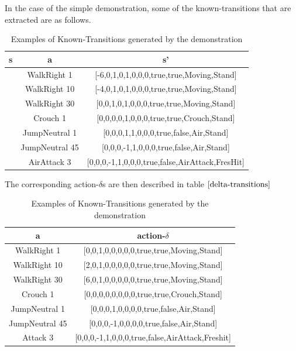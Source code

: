 In the case of the simple demonstration, some of the known-transitions that are extracted are as follows.

\begin{table}[h]
	\centering
	\small
	\caption{Examples of Known-Transitions generated by the demonstration}
	\begin{tabular}{| c | c | c |}
		\hline
		s & a & s' \\
		\hline
		[-6,0,0,0,1,0,0,0,true,true,Stand,Stand] & WalkRight 1 & [-6,0,1,0,1,0,0,0,true,true,Moving,Stand]\\
		\hline
		[-6,0,0,0,1,0,0,0,true,true,Stand,Stand] & WalkRight 10 & [-4,0,1,0,1,0,0,0,true,true,Moving,Stand]\\
		\hline
		[-6,0,0,0,1,0,0,0,true,true,Stand,Stand] & WalkRight 30 & [0,0,1,0,1,0,0,0,true,true,Moving,Stand]\\
		\hline
		[0,0,1,0,1,0,0,0,true,true,Moving,Stand] & Crouch 1 & [0,0,0,0,1,0,0,0,true,true,Crouch,Stand]\\
		\hline
		[0,0,1,0,1,0,0,0,true,true,Crouch,Stand] & JumpNeutral 1 & [0,0,0,1,1,0,0,0,true,false,Air,Stand]\\
		\hline
		[0,0,1,0,1,0,0,0,true,true,Crouch,Stand] & JumpNeutral 45 & [0,0,0,-1,1,0,0,0,true,false,Air,Stand]\\
		\hline
		[0,0,0,-1,1,0,0,0,true,false,Air,Stand] & AirAttack 3 & [0,0,0,-1,1,0,0,0,true,false,AirAttack,FresHit]\\
		\hline
	\end{tabular}
	\label{transitions}
\end{table}

The corresponding action-$\delta$s are then described in table $\ref{delta-transitions}$

\begin{table}[h]
	\centering
	\begin{tabular}{| c | c |}
		\hline
		a & action-$\delta$ \\
		\hline
		WalkRight 1 & [0,0,1,0,0,0,0,0,true,true,Moving,Stand]\\
		\hline
		WalkRight 10 & [2,0,1,0,0,0,0,0,true,true,Moving,Stand]\\
		\hline
		WalkRight 30 & [6,0,1,0,0,0,0,0,true,true,Moving,Stand]\\
		\hline
		Crouch 1 & [0,0,0,0,0,0,0,0,true,true,Crouch,Stand]\\
		\hline
		JumpNeutral 1 & [0,0,0,1,0,0,0,0,true,false,Air,Stand]\\
		\hline
		JumpNeutral 45 & [0,0,0,-1,0,0,0,0,true,false,Air,Stand]\\
		\hline
		Attack 3 & [0,0,0,-1,1,0,0,0,true,false,AirAttack,Freshit]\\
		\hline
	\end{tabular}
	\caption{Examples of Known-Transitions generated by the demonstration}
	\label{delta-transitions}
\end{table}

